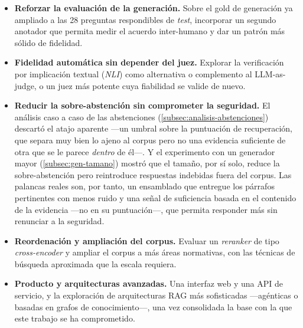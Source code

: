 \begin{itemize}
  \item \textbf{Reforzar la evaluación de la generación.} Sobre el gold de generación ya ampliado a las 28 preguntas respondibles de \emph{test}, incorporar un segundo anotador que permita medir el acuerdo inter-humano y dar un patrón más sólido de fidelidad.
  \item \textbf{Fidelidad automática sin depender del juez.} Explorar la verificación por implicación textual (\emph{NLI}) como alternativa o complemento al LLM-as-judge, o un juez más potente cuya fiabilidad se valide de nuevo.
  \item \textbf{Reducir la sobre-abstención sin comprometer la seguridad.} El análisis caso a caso de las abstenciones (\ref{subsec:analisis-abstenciones}) descartó el atajo aparente —un umbral sobre la puntuación de recuperación, que separa muy bien lo ajeno al corpus pero no una evidencia suficiente de otra que se le parece \emph{dentro} de él—. Y el experimento con un generador mayor (\ref{subsec:gen-tamano}) mostró que el tamaño, por sí solo, reduce la sobre-abstención pero reintroduce respuestas indebidas fuera del corpus. Las palancas reales son, por tanto, un ensamblado que entregue los párrafos pertinentes con menos ruido y una señal de suficiencia basada en el contenido de la evidencia —no en su puntuación—, que permita responder más sin renunciar a la seguridad.
  \item \textbf{Reordenación y ampliación del corpus.} Evaluar un \emph{reranker} de tipo \emph{cross-encoder} y ampliar el corpus a más áreas normativas, con las técnicas de búsqueda aproximada que la escala requiera.
  \item \textbf{Producto y arquitecturas avanzadas.} Una interfaz web y una API de servicio, y la exploración de arquitecturas RAG más sofisticadas —agénticas o basadas en grafos de conocimiento—, una vez consolidada la base con la que este trabajo se ha comprometido.
\end{itemize}
